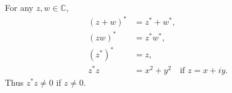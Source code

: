 For any $z, w \in \mathbb{C}$,
\begin{align*}
(z + w)^* &= z^* + w^*, \\
(zw)^* &= z^* w^*, \\
(z^*)^* &= z, \\
z^* z &= x^2 + y^2 \quad \text{if } z = x + iy.
\end{align*}
Thus $z^* z \neq 0$ if $z \neq 0$.
